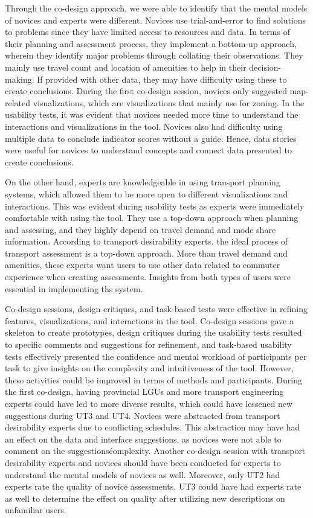 \documentclass{sigchi}
\begin{document}
Through the co-design approach, we were able to identify that the mental models of novices and experts were different. Novices use trial-and-error to find solutions to problems since they have limited access to resources and data. In terms of their planning and assessment process, they implement a bottom-up approach, wherein they identify major problems through collating their observations. They mainly use travel count and location of amenities to help in their decision-making. If provided with other data, they may have difficulty using these to create conclusions. During the first co-design session, novices only suggested map-related visualizations, which are visualizations that mainly use for zoning. In the usability tests, it was evident that novices needed more time to understand the interactions and visualizations in the tool. Novices also had difficulty using multiple data to conclude indicator scores without a guide. Hence, data stories were useful for novices to understand concepts and connect data presented to create conclusions. 

On the other hand, experts are knowledgeable in using transport planning systems, which allowed them to be more open to different visualizations and interactions. This was evident during usability tests as experts were immediately comfortable with using the tool. They use a top-down approach when planning and assessing, and they highly depend on travel demand and mode share information. According to transport desirability experts, the ideal process of transport assessment is a top-down approach. More than travel demand and amenities, these experts want users to use other data related to commuter experience when creating assessments. Insights from both types of users were essential in implementing ths system.

Co-design sessions, design critiques, and task-based tests were effective in refining features, visualizations, and interactions in the tool. Co-design sessions gave a skeleton to create prototypes, design critiques during the usability tests resulted to specific comments and suggestions for refinement, and task-based usability tests effectively presented the confidence and mental workload of participants per task to give insights on the complexity and intuitiveness of the tool. However, these activities could be improved in terms of methods and participants. During the first co-design, having provincial LGUs and more transport engineering experts could have led to more diverse results, which could have lessened new suggestions during UT3 and UT4. Novices were abstracted from transport desirability experts due to conflicting schedules. This abstraction may have had an effect on the data and interface suggestions, as novices were not able to comment on the suggestions\' complexity. Another co-design session with transport desirability experts and novices should have been conducted for experts to understand the mental models of novices as well. Moreover, only UT2 had experts rate the quality of novice assessments. UT3 could have had experts rate as well to determine the effect on quality after utilizing new descriptions on unfamiliar users.
\end{document}
